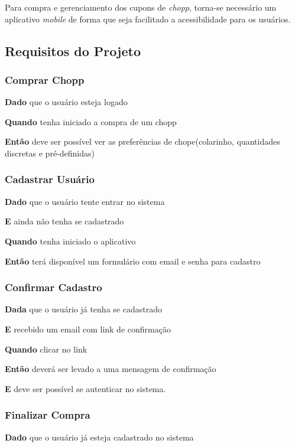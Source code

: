 Para compra e gerenciamento dos cupons de \textit{chopp}, torna-se necessário um aplicativo \textit{mobile} de forma que seja facilitado a acessibilidade para os usuários.

\subsection{Requisitos do Projeto}

\subsubsection{Comprar Chopp}

\textbf{Dado} que o usuário esteja logado

\textbf{Quando} tenha iniciado a compra de um chopp

\textbf{Então} deve ser possível ver as preferências de chope(colarinho, quantidades discretas e pré-definidas)

\subsubsection{Cadastrar Usuário}

\textbf{Dado} que o usuário tente entrar no sistema 

\textbf{E} ainda não tenha se cadastrado

\textbf{Quando} tenha iniciado o aplicativo

\textbf{Então} terá disponível um formulário com email e senha para cadastro

\subsubsection{Confirmar Cadastro}

\textbf{Dada} que o usuário já tenha se cadastrado

\textbf{E} recebido um email com link de confirmação

\textbf{Quando} clicar no link

\textbf{Então} deverá ser levado a uma mensagem de confirmação

\textbf{E} deve ser possível se autenticar no sistema.

\subsubsection{Finalizar Compra}

\textbf{Dado} que o usuário já esteja cadastrado no sistema

